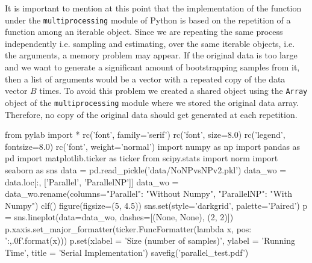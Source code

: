 \documentclass[11pt]{article}
\begin{document}
\medskip

It is important to mention at this point that the implementation of the function under the \texttt{multiprocessing} module
of Python is based on the repetition of a function among an iterable object. Since we are repeating the same process independently
i.e. sampling and estimating, over the same iterable objects, i.e. the arguments\footnotemark, a memory problem may appear. If the original
data is too large and we want to generate a significant amount of bootstrapping samples from it, then a list of arguments
would be a vector with a repeated copy of the data vector $B$ times. To avoid this problem we created a shared object using
the \texttt{Array} object of the \texttt{multiprocessing} module where we stored the original data array. Therefore, no
copy of the original data should get generated at each repetition.


\medskip

\begin{pycode}
from pylab import *
rc('font', family='serif')
rc('font', size=8.0)
rc('legend', fontsize=8.0)
rc('font', weight='normal')
import numpy as np
import pandas as pd
import matplotlib.ticker as ticker
from scipy.stats import norm
import seaborn as sns
data = pd.read_pickle('data/NoNPvsNPv2.pkl')
data_wo = data.loc[:, ['Parallel', 'ParallelNP']]
data_wo = data_wo.rename(columns={"Parallel": "Without Numpy", "ParallelNP": "With Numpy"})
clf()
figure(figsize=(5, 4.5))
sns.set(style='darkgrid', palette='Paired')
p = sns.lineplot(data=data_wo, dashes=[(None, None), (2, 2)])
p.xaxis.set_major_formatter(ticker.FuncFormatter(lambda x, pos: '{:,.0f}'.format(x)))
p.set(xlabel = 'Size (number of samples)', ylabel = 'Running Time', title = 'Serial Implementation')
savefig('parallel_test.pdf')
\end{pycode}
\end{document}
